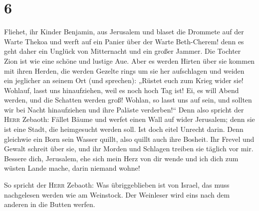 \hypertarget{section-5}{%
\section{6}\label{section-5}}

 Fliehet, ihr Kinder Benjamin, aus Jerusalem und blaset
die Drommete auf der Warte Thekoa und werft auf ein Panier über der
Warte Beth-Cherem! denn es geht daher ein Unglück von Mitternacht und
ein großer Jammer.  Die Tochter Zion ist wie eine schöne
und lustige Aue.  Aber es werden Hirten über sie kommen
mit ihren Herden, die werden Gezelte rings um sie her aufschlagen und
weiden ein jeglicher an seinem Ort (und sprechen): 
„Rüstet euch zum Krieg wider sie! Wohlauf, lasst uns hinaufziehen, weil
es noch hoch Tag ist! Ei, es will Abend werden, und die Schatten werden
groß!  Wohlan, so lasst uns auf sein, und sollten wir bei
Nacht hinaufziehen und ihre Paläste verderben!{}``  Denn
also spricht der \textsc{Herr} Zebaoth: Fället Bäume und werfet einen
Wall auf wider Jerusalem; denn sie ist eine Stadt, die heimgesucht
werden soll. Ist doch eitel Unrecht darin.  Denn gleichwie
ein Born sein Wasser quillt, also quillt auch ihre Bosheit. Ihr Frevel
und Gewalt schreit über sie, und ihr Morden und Schlagen treiben sie
täglich vor mir.  Bessere dich, Jerusalem, ehe sich mein
Herz von dir wende und ich dich zum wüsten Lande mache, darin niemand
wohne!

 So spricht der \textsc{Herr} Zebaoth: Was übriggeblieben
ist von Israel, das muss nachgelesen werden wie am Weinstock. Der
Weinleser wird eins nach dem anderen in die Butten werfen.

